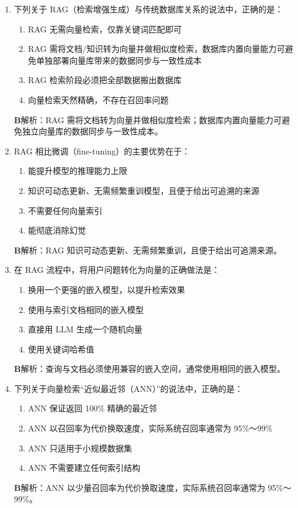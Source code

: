 \documentclass[UTF8,a4paper,11pt]{ctexart}
\newenvironment{answer}%
  {\begin{ans}\noindent{\bfseries\color{ansframe}【答案】}\hspace{0.4em}}%
  {\end{ans}}
\begin{document}
\begin{enumerate}
\item 下列关于 RAG（检索增强生成）与传统数据库关系的说法中，正确的是：
\begin{enumerate}[label=\Alph*., leftmargin=2.2em, itemsep=1pt]
\item RAG 无需向量检索，仅靠关键词匹配即可
\item RAG 需将文档/知识转为向量并做相似度检索，数据库内置向量能力可避免单独部署向量库带来的数据同步与一致性成本
\item RAG 检索阶段必须把全部数据搬出数据库
\item 向量检索天然精确，不存在召回率问题
\end{enumerate}
\begin{answer}
\textbf{B}\quad 解析：RAG 需将文档转为向量并做相似度检索；数据库内置向量能力可避免独立向量库的数据同步与一致性成本。
\end{answer}

\item RAG 相比微调（fine-tuning）的主要优势在于：
\begin{enumerate}[label=\Alph*., leftmargin=2.2em, itemsep=1pt]
\item 能提升模型的推理能力上限
\item 知识可动态更新、无需频繁重训模型，且便于给出可追溯的来源
\item 不需要任何向量索引
\item 能彻底消除幻觉
\end{enumerate}
\begin{answer}
\textbf{B}\quad 解析：RAG 知识可动态更新、无需频繁重训，且便于给出可追溯来源。
\end{answer}

\item 在 RAG 流程中，将用户问题转化为向量的正确做法是：
\begin{enumerate}[label=\Alph*., leftmargin=2.2em, itemsep=1pt]
\item 换用一个更强的嵌入模型，以提升检索效果
\item 使用与索引文档相同的嵌入模型
\item 直接用 LLM 生成一个随机向量
\item 使用关键词哈希值
\end{enumerate}
\begin{answer}
\textbf{B}\quad 解析：查询与文档必须使用兼容的嵌入空间，通常使用相同的嵌入模型。
\end{answer}

\item 下列关于向量检索“近似最近邻（ANN）”的说法中，正确的是：
\begin{enumerate}[label=\Alph*., leftmargin=2.2em, itemsep=1pt]
\item ANN 保证返回 100\% 精确的最近邻
\item ANN 以召回率为代价换取速度，实际系统召回率通常为 95\%～99\%
\item ANN 只适用于小规模数据集
\item ANN 不需要建立任何索引结构
\end{enumerate}
\begin{answer}
\textbf{B}\quad 解析：ANN 以少量召回率为代价换取速度，实际系统召回率通常为 95\%～99\%。
\end{answer}


\end{enumerate}
\end{document}
